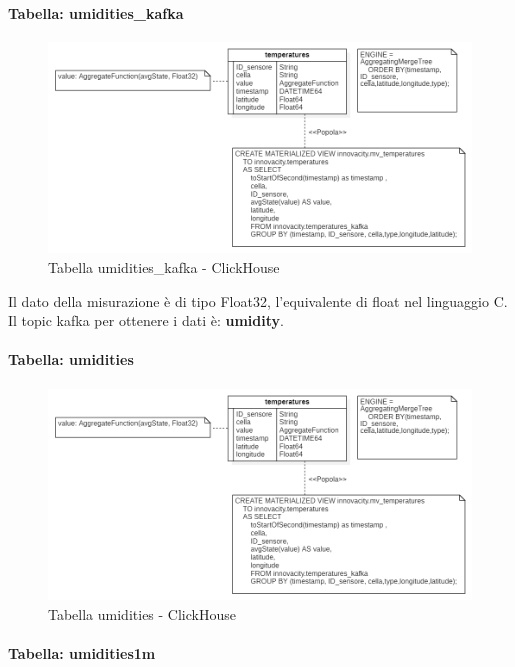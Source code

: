 \paragraph{Tabella: umidities\_kafka}
\begin{figure}[H]
    \centering
    \includegraphics[width=1\textwidth]{../Images/SpecificaTecnica/temperatures.PNG}
    \caption{Tabella umidities\_kafka - ClickHouse}
    \label{fig:umidities_kafka}
  \end{figure}
Il dato della misurazione è di tipo Float32, l’equivalente di float nel linguaggio C. Il topic
kafka per ottenere i dati è: \textbf{umidity}.
\paragraph{Tabella: umidities}
\begin{figure}[H]
    \centering
    \includegraphics[width=1\textwidth]{../Images/SpecificaTecnica/temperatures.PNG}
    \caption{Tabella umidities - ClickHouse}
    \label{fig:umidities}
  \end{figure}
\paragraph{Tabella: umidities1m}        

